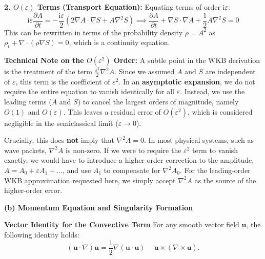 \begin{solution}
\textbf{2. $O(\varepsilon)$ Terms (Transport Equation):}
Equating terms of order $\mathrm{i} \varepsilon$:
\[ \mathrm{i} \varepsilon \frac{\partial A}{\partial t} = - \frac{\mathrm{i} \varepsilon}{2} (2 \nabla A \cdot \nabla S + A \nabla^2 S) \implies \boxed{\frac{\partial A}{\partial t} + \nabla S \cdot \nabla A + \frac{1}{2} A \nabla^2 S = 0} \]
This can be rewritten in terms of the probability density $\rho = A^2$ as $\rho_t + \nabla \cdot (\rho \nabla S) = 0$, which is a continuity equation.

\begin{remark}
\textbf{Technical Note on the $O(\varepsilon^2)$ Order:}
A subtle point in the WKB derivation is the treatment of the term $\frac{\varepsilon^2}{2} \nabla^2 A$. Since we assumed $A$ and $S$ are independent of $\varepsilon$, this term is the coefficient of $\varepsilon^2$. In an \textbf{asymptotic expansion}, we do not require the entire equation to vanish identically for all $\varepsilon$. Instead, we use the leading terms ($A$ and $S$) to cancel the largest orders of magnitude, namely $O(1)$ and $O(\varepsilon)$. This leaves a residual error of $O(\varepsilon^2)$, which is considered negligible in the semiclassical limit ($\varepsilon \to 0$).

Crucially, this does \textbf{not} imply that $\nabla^2 A = 0$. In most physical systems, such as wave packets, $\nabla^2 A$ is non-zero. If we were to require the $\varepsilon^2$ term to vanish exactly, we would have to introduce a higher-order correction to the amplitude, $A = A_0 + \varepsilon A_1 + \dots$, and use $A_1$ to compensate for $\nabla^2 A_0$. For the leading-order WKB approximation requested here, we simply accept $\nabla^2 A$ as the source of the higher-order error.
\end{remark}

\textbf{(b) Momentum Equation and Singularity Formation}

\begin{lemma}
\textbf{Vector Identity for the Convective Term}
For any smooth vector field $\mathbf{u}$, the following identity holds:
\[ (\mathbf{u} \cdot \nabla) \mathbf{u} = \frac{1}{2} \nabla (\mathbf{u} \cdot \mathbf{u}) - \mathbf{u} \times (\nabla \times \mathbf{u}). \]
\end{lemma}


\end{solution}
